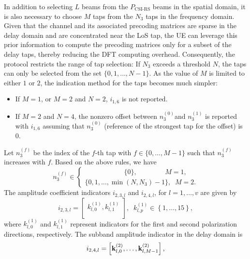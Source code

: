 \documentclass[lettersize,journal]{IEEEtran}
\begin{document}
In addition to selecting $L$ beams from the $P_{\text{CSI-RS}}$ beams in the spatial domain, it is also necessary to choose $M$ taps from the $N_3$ taps in the frequency domain. Given that the channel and its associated precoding matrices are sparse in the delay domain and are concentrated near the LoS tap, the UE can leverage this prior information to compute the precoding matrices only for a subset of the delay taps, thereby reducing the DFT computing overhead. Consequently, the protocol restricts the range of tap selection: If $N_3$ exceeds a threshold $N$, the taps can only be selected from the set $\{0, 1, \ldots, N-1\}$. As the value of $M$ is limited to either $1$ or $2$, the indication method for the taps becomes much simpler:
\begin{itemize}
    \item If $M=1$, or $M=2$ and $N=2$, $i_{1,6}$ is not reported.
    \item If $M=2$ and $N=4$, the nonzero offset between $n_3^{(0)}$and $n_3^{(1)}$ is reported with $i_{1,6}$ assuming that $n_3^{(0)}$ (reference of the strongest tap for the offset) is $0$. 
\end{itemize}
Let $n_3^{(f)}$ be the index of the $f$-th tap with $f\in \{0,\ldots,M-1\}$ such that $n_3^{(f)}$ increases with $f$. Based on the above rules, we have 
\begin{equation}
n_3^{(f)} \in \left\{ {\begin{array}{*{20}{c}}
{\;\;\;\;\;\qquad\quad\;\;\;\;\;\{ 0\} ,\;\;\;\;\qquad\quad M = 1,}\\
{\{ 0,1,\ldots,\min (N,{N_3}) - 1\} ,\;\;M = 2.}
\end{array}} \right. 
\end{equation}
The amplitude coefficient indicators $i_{2,3,l}$ and $i_{2,4,l}$, for $l=1,\ldots,v$ are given by
\begin{equation}
i_{2,3,l}=\left[\begin{matrix}k_{l,0}^{\left(1\right)},k_{l,1}^{\left(1\right)}\\\end{matrix}\right], \;\;k_{l,p}^{(1)}\in\left\{1,\ldots,15\right\},
\end{equation}
where $k_{l,0}^{\left(1\right)}$ and $k_{l,1}^{\left(1\right)}$ represent indicators for the first and second polarization directions, respectively. The subband amplitude indicator in the delay domain is 
\begin{equation}\label{a72}
    i_{2,4,l}=\left[{\bf{k}}_{l,0}^{(2)},\ldots ,{\bf{k}}_{l,M-1}^{(2)}\right],
\end{equation}
\end{document}
